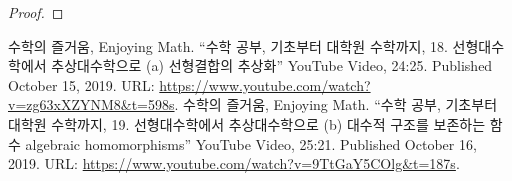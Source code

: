 \documentclass[11pt,openany]{article}
\begin{document}
\begin{proof}
%
%
%
%
%
%
\end{proof}
%

\vfill
\begin{thebibliography}{9}
	수학의 즐거움, Enjoying Math. ``수학 공부, 기초부터 대학원 수학까지, 18. 선형대수학에서 추상대수학으로 (a) 선형결합의 추상화'' YouTube Video, 24:25. Published 
	October 15, 2019. URL: \url{https://www.youtube.com/watch?v=zg63xXZYNM8&t=598s}.
	수학의 즐거움, Enjoying Math. ``수학 공부, 기초부터 대학원 수학까지, 19. 선형대수학에서 추상대수학으로 (b) 대수적 구조를 보존하는 함수 algebraic homomorphisms'' YouTube Video, 25:21. Published 
	October 16, 2019. URL: \url{https://www.youtube.com/watch?v=9TtGaY5COlg&t=187s}.
\end{thebibliography}
\end{document}

